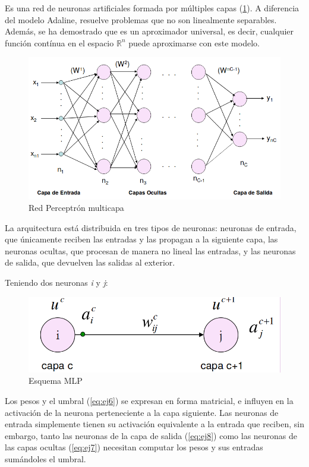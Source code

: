 \documentclass[11pt,spanish,listoffigures,listoftables]{tfgetsinf}
\begin{document}
\par Es una red de neuronas artificiales formada por múltiples capas (\ref{fig:mlp}). A diferencia del modelo Adaline, resuelve problemas que no son linealmente separables. Además, se ha demostrado que es un aproximador universal, es decir,  cualquier función contínua en el espacio $\mathbb{R}^n$ puede aproximarse con este modelo. 

\begin{figure}[H]
\centering
\includegraphics[scale=0.5]{mlp}
\caption{Red Perceptrón multicapa \cite{MLP}}\label{fig:mlp}
\end{figure}

\par La arquitectura está distribuida en tres tipos de neuronas: neuronas de entrada, que únicamente reciben las entradas y las propagan a la siguiente capa, las neuronas ocultas, que procesan de manera no lineal las entradas, y las neuronas de salida, que devuelven las salidas al exterior.

\par Teniendo dos neuronas \textit{i} y \textit{j}:

\begin{figure}[H]
\centering
\includegraphics[scale=0.3]{mlpesquema}
\caption{Esquema MLP \cite{MLP}}\label{fig:esquema}
\end{figure}

\par Los pesos y el umbral (\ref{eq:ej6}) se expresan en forma matricial, e influyen en la activación de la neurona perteneciente a la capa siguiente. Las neuronas de entrada simplemente tienen su activación equivalente a la entrada que reciben, sin embargo, tanto las neuronas de la capa de salida (\ref{eq:ej8}) como las neuronas de las capas ocultas (\ref{eq:ej7}) necesitan computar los pesos y sus entradas sumándoles el umbral.
\end{document}
